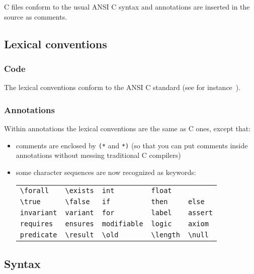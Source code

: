 \documentclass[a4paper,12pt]{report}
\begin{document}
C files conform to the usual ANSI C
syntax and annotations are inserted in the source as comments.

\subsection{Lexical conventions}
\label{lexical:c}

\subsubsection{Code}

The lexical conventions conform to the ANSI C standard (see
for instance~\cite{KR88}).

\subsubsection{Annotations}

Within annotations the lexical conventions are the same as C ones,
except that:
\begin{itemize}
\item comments are enclosed by \texttt{(*} and \texttt{*)} (so that
  you can put comments inside annotations without messing traditional
  C compilers)
\item some character sequences are now recognized as keywords: \par
  \begin{center}
  \begin{tabular}{l@{\qquad}l@{\qquad}l@{\qquad}l@{\qquad}l}
  \verb!\forall! & \verb!\exists! & \verb!int! & \verb!float! \\
  \verb!\true! & \verb!\false! & \verb!if! & \verb!then! & \verb!else! \\
  \verb!invariant! & \verb!variant! & \verb!for! & \verb!label! & 
  \verb!assert! \\ 
  \verb!requires! & \verb!ensures! & \verb!modifiable! & \verb!logic! & 
  \verb!axiom! \\
  \verb!predicate! & \verb!\result! & \verb!\old! & 
  \verb!\length! & \verb!\null!
  \end{tabular}
  \end{center}
\end{itemize}

\subsection{Syntax}
\end{document}
